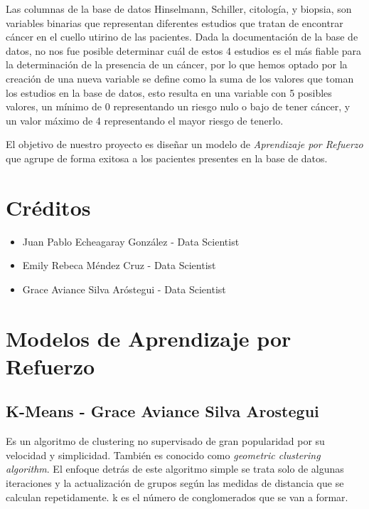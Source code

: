 \documentclass[journal]{IEEEtran}
\begin{document}
        Las columnas de la base de datos Hinselmann, Schiller, citología, y biopsia, son variables binarias que representan diferentes estudios que tratan de encontrar cáncer en el cuello utirino de las pacientes. Dada la documentación de la base de datos, no nos fue posible determinar cuál de estos 4 estudios es el más fiable para la determinación de la presencia de un cáncer, por lo que hemos optado por la creación de una nueva variable se define como la suma de los valores que toman los estudios en la base de datos, esto resulta en una variable con 5 posibles valores, un mínimo de 0 representando un riesgo nulo o bajo de tener cáncer, y un valor máximo de 4 representando el mayor riesgo de tenerlo.

        El objetivo de nuestro proyecto es diseñar un modelo de \emph{Aprendizaje por Refuerzo} que agrupe de forma exitosa a los pacientes presentes en la base de datos.

    \section{Créditos} \label{credits}
       
        \begin{itemize}
            \item Juan Pablo Echeagaray González - Data Scientist
            \item Emily Rebeca Méndez Cruz - Data Scientist
            \item Grace Aviance Silva Aróstegui - Data Scientist
        \end{itemize}

    \section{Modelos de Aprendizaje por Refuerzo} \label{modelos}
        
        \vspace*{3mm}
        \subsection{K-Means - Grace Aviance Silva Arostegui} \label{kmeans}
        
        Es un algoritmo de clustering no supervisado de gran popularidad por su velocidad y simplicidad. También es conocido como \textit{geometric clustering algorithm}. El enfoque detrás de este algoritmo simple se trata solo de algunas iteraciones y la actualización de grupos según las medidas de distancia que se calculan repetidamente. k es el número de conglomerados que se van a formar.
            
\end{document}
